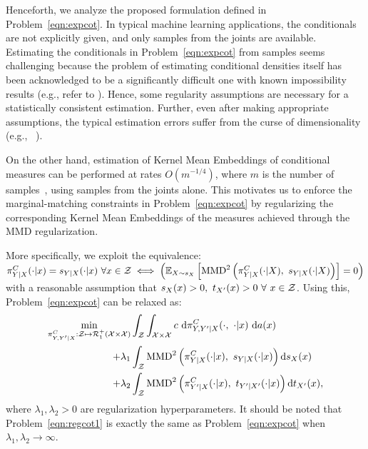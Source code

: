 Henceforth, we analyze the proposed formulation defined in Problem~\ref{eqn:expcot}.
In typical machine learning applications, the conditionals are not explicitly given, and only samples from the joints are available. Estimating the conditionals in Problem~\ref{eqn:expcot} from samples seems challenging because the problem of estimating conditional densities itself has been acknowledged to be a significantly difficult one with known impossibility results (e.g., refer to 
\citet[Sec. (2)]{LiNeykovBalakrishnan}). Hence, some regularity assumptions are necessary for a statistically consistent estimation. Further, even after making appropriate assumptions, the typical estimation errors suffer from the curse of dimensionality (e.g., 
~\citet[Theorem~(2.1)]{Graham2020MinimaxRA}).

On the other hand, estimation of Kernel Mean Embeddings of conditional measures can be performed at rates $O(m^{-1/4})$, where $m$ is the number of samples~\citep{Song2009HilbertSE,gretton}, using samples from the joints alone. This motivates us to enforce the marginal-matching constraints in Problem~\ref{eqn:expcot} by regularizing the corresponding Kernel Mean Embeddings of the measures \citep{Muandet_2017} achieved through the MMD regularization.

More specifically, we exploit the equivalence: $\pi^C_{Y|X}(\cdot|x)=s_{Y|X}(\cdot|x)\ \forall x\in \mathcal{Z}\iff\left(\mathbb{E}_{X\sim s_{X}}\left[\textup{MMD}^2\left(\pi^C_{Y|X}(\cdot|X), ~s_{Y|X}(\cdot|X)\right)\right]=0\right)$ with a reasonable assumption that $s_X(x)>0, \ t_{X'}(x)>0\ \forall\ x\in\calZ$. Using this, Problem~\ref{eqn:expcot} can be relaxed as:
\begin{align}\label{eqn:regcot1}
\min_{\pi^C_{Y, Y'|X}:\calZ\mapsto\mathcal{R}_1^+(\calX\times\calX)}&\int_{\calZ}\int_{\calX\times\calX} c\ \textup{d}\pi^C_{Y, Y'|X}(\cdot,\ \cdot|x)\ \textup{d}a(x) \nonumber\\+ \lambda_1&\int_\calZ\MMD^2\left(\pi^C_{Y|X}(\cdot|x), \ s_{Y|X}(\cdot|x)\right)\textup{d}s_X(x)\nonumber\\
+\lambda_2&\int_\calZ\MMD^2\left(\pi^C_{Y'|X}(\cdot|x), \ t_{Y'|X'}(\cdot|x)\right)\textup{d}t_{X'}(x),
\end{align}
where $\lambda_1,\lambda_2>0$ are regularization hyperparameters. It should be noted that Problem~\ref{eqn:regcot1} is exactly the same as Problem~\ref{eqn:expcot} when $\lambda_1,\lambda_2\rightarrow\infty$.

